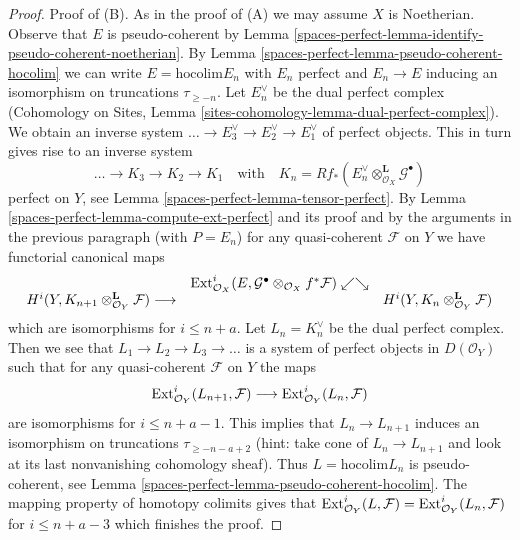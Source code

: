 \begin{proof}
\medskip\noindent
Proof of (B). As in the proof of (A) we may assume $X$ is Noetherian.
Observe that $E$ is pseudo-coherent by
Lemma \ref{spaces-perfect-lemma-identify-pseudo-coherent-noetherian}.
By Lemma \ref{spaces-perfect-lemma-pseudo-coherent-hocolim} we can write
$E = \text{hocolim} E_n$ with $E_n$ perfect and $E_n \to E$ inducing
an isomorphism on truncations $\tau_{\geq -n}$. Let $E_n^\vee$
be the dual perfect complex
(Cohomology on Sites, Lemma \ref{sites-cohomology-lemma-dual-perfect-complex}).
We obtain an inverse system $\ldots \to E_3^\vee \to E_2^\vee \to E_1^\vee$
of perfect objects. This in turn gives rise to an inverse system
$$
\ldots \to K_3 \to K_2 \to K_1\quad\text{with}\quad
K_n = Rf_*(E_n^\vee \otimes_{\mathcal{O}_X}^\mathbf{L} \mathcal{G}^\bullet)
$$
perfect on $Y$, see Lemma \ref{spaces-perfect-lemma-tensor-perfect}.
By Lemma \ref{spaces-perfect-lemma-compute-ext-perfect} and its proof and
by the arguments in the previous paragraph (with $P = E_n$)
for any quasi-coherent $\mathcal{F}$ on $Y$ we have
functorial canonical maps
$$
\begin{array}{ccc} & \operatorname{Ext}^i_{\mathcal{O}_X}(E,
\mathcal{G}^\bullet \otimes_{\mathcal{O}_X} f^*\mathcal{F})
\swarrow\searrow &  \\ H^i(Y, K_{n + 1} \otimes_{\mathcal{O}_Y}^\mathbf{L} \mathcal{F})
\longrightarrow &  & H^i(Y, K_n \otimes_{\mathcal{O}_Y}^\mathbf{L} \mathcal{F})\end{array}
$$
which are isomorphisms for $i \leq n + a$.
Let $L_n = K_n^\vee$ be the dual perfect complex.
Then we see that $L_1 \to L_2 \to L_3 \to \ldots$
is a system of perfect objects in $D(\mathcal{O}_Y)$
such that for any quasi-coherent $\mathcal{F}$ on $Y$
the maps
$$
\operatorname{Ext}^i_{\mathcal{O}_Y}(L_{n + 1}, \mathcal{F})
\longrightarrow
\operatorname{Ext}^i_{\mathcal{O}_Y}(L_n, \mathcal{F})
$$
are isomorphisms for $i \leq n + a - 1$. This implies that
$L_n \to L_{n + 1}$ induces an isomorphism on truncations
$\tau_{\geq -n - a + 2}$ (hint: take cone of $L_n \to L_{n + 1}$
and look at its last nonvanishing cohomology sheaf).
Thus $L = \text{hocolim} L_n$ is pseudo-coherent, see
Lemma \ref{spaces-perfect-lemma-pseudo-coherent-hocolim}. The mapping property
of homotopy colimits gives that
$\operatorname{Ext}^i_{\mathcal{O}_Y}(L, \mathcal{F}) =
\operatorname{Ext}^i_{\mathcal{O}_Y}(L_n, \mathcal{F})$
for $i \leq n + a - 3$ which finishes the proof.
\end{proof}

